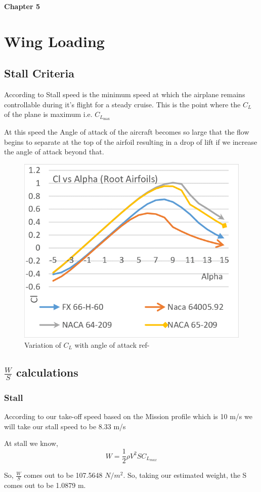 \documentclass[12 pt]{article}
\begin{document}
\newpage

\textbf{\Huge{Chapter 5}}

\section{Wing Loading}

\subsection{Stall Criteria}
According to \cite{stall1} Stall speed is the minimum speed at which the airplane remains controllable during it's flight for a steady cruise. This is the point where the $C_L$ of the plane is maximum i.e. $C_{L_{\text{max}}}$

At this speed the Angle of attack of the aircraft becomes so large that the flow begins to separate at the top of the airfoil resulting in a drop of lift if we increase the angle of attack beyond that.

\begin{figure}[h]
    \centering
    \includegraphics[width=0.4\linewidth]{Extra pics/Cllvsalpha.png}
    \caption{Variation of $C_L$ with angle of attack ref- \cite{stallpic}}
    \label{Variation of $C_L$ with angle}
\end{figure}

\subsection{ $\frac{W}{S}$ calculations }

\subsubsection{Stall}

According to our take-off speed based on the Mission profile which is 10 m/s we will take our stall speed to be 8.33 m/s

At stall we know,
$$W = \frac{1}{2} \rho V^2 S C_{L_{max}} $$

So, $\frac{W}{S}$ comes out to be 107.5648 $N/m^2$. So, taking our estimated weight, the S comes out to be 1.0879 m.
\end{document}
